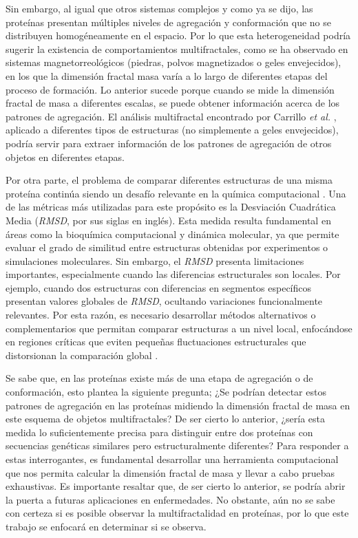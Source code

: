 Sin embargo, al igual que otros sistemas complejos y como ya se dijo, las proteínas  presentan m\'{u}ltiples niveles de agregaci\'{o}n y conformaci\'{o}n que no se distribuyen homog\'{e}neamente en el espacio. Por lo que esta heterogeneidad podr\'{i}a sugerir la existencia de comportamientos multifractales, como se ha observado en sistemas magnetorreol\'{o}gicos (piedras, polvos magnetizados o geles envejecidos), en los que la dimensi\'{o}n fractal masa var\'{i}a a lo largo de diferentes etapas del proceso de formaci\'{o}n. Lo anterior sucede porque cuando se mide la dimensi\'{o}n fractal de masa a diferentes escalas, se puede obtener informaci\'{o}n acerca de los patrones de agregaci\'{o}n. El an\'{a}lisis multifractal encontrado por Carrillo \textit{et al.} \cite{Carrillo2003}, aplicado a diferentes tipos de estructuras (no simplemente a geles envejecidos), podr\'{i}a servir para extraer informaci\'{o}n de los patrones de agregaci\'{o}n de otros objetos en diferentes etapas. 

Por otra parte, el problema de comparar diferentes estructuras de una misma prote\'{i}na contin\'{u}a siendo un desaf\'{i}o relevante en la qu\'{i}mica computacional \cite{Kufareva2012}. Una de las m\'{e}tricas m\'{a}s utilizadas para este prop\'{o}sito es la Desviaci\'{o}n Cuadr\'{a}tica Media (\textit{RMSD}, por sus siglas en ingl\'{e}s). Esta medida resulta fundamental en \'{a}reas como la bioqu\'{i}mica computacional y dinámica molecular, ya que permite evaluar el grado de similitud entre estructuras obtenidas por experimentos o simulaciones moleculares. Sin embargo, el \textit{RMSD} presenta limitaciones importantes, especialmente cuando las diferencias estructurales son locales. Por ejemplo, cuando dos estructuras con diferencias en segmentos espec\'{i}ficos  presentan valores globales de \textit{RMSD}, ocultando variaciones funcionalmente relevantes. Por esta raz\'{o}n, es necesario desarrollar m\'{e}todos alternativos o complementarios que permitan comparar estructuras a un nivel local, enfoc\'{a}ndose en regiones cr\'{i}ticas que eviten pequeñas fluctuaciones estructurales que distorsionan la comparaci\'{o}n global \cite{Kufareva2012}.

Se sabe que, en las prote\'{i}nas existe m\'{a}s de una etapa de agregaci\'{o}n o de conformaci\'{o}n, esto plantea la siguiente pregunta; ¿Se podr\'{i}an detectar estos patrones de agregaci\'{o}n en las prote\'{i}nas midiendo la dimensi\'{o}n fractal de masa en este esquema de objetos multifractales? De ser cierto lo anterior, ¿ser\'{i}a esta medida lo suficientemente precisa para distinguir entre dos prote\'{i}nas con secuencias gen\'{e}ticas similares pero estructuralmente diferentes? Para responder a estas interrogantes, es fundamental desarrollar una herramienta computacional que nos permita calcular la dimensi\'{o}n fractal de masa y llevar a cabo pruebas exhaustivas. Es importante resaltar que, de ser cierto lo anterior, se podr\'{i}a abrir la puerta a futuras aplicaciones en enfermedades. No obstante, a\'{u}n no se sabe con certeza si es posible observar la multifractalidad en prote\'{i}nas, por lo que este trabajo se enfocar\'{a} en determinar si se observa.


